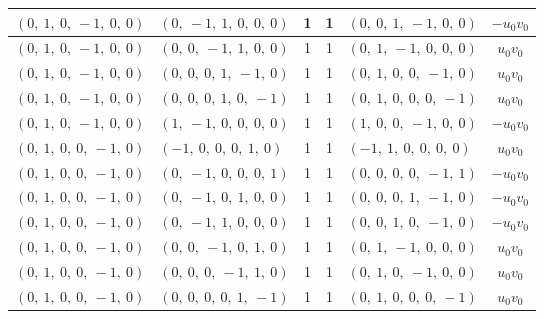 \documentclass[11pt]{article}
\theoremstyle{definition}
\begin{document}
\begin{longtable}{|l|l|c|c|l|c|}
    \hline
    $\left( 0, \  1, \  0, \  -1, \  0, \  0\right)$ & $\left( 0, \  -1, \  1, \  0, \  0, \  0\right)$ & 1 & 1 & $\left( 0, \  0, \  1, \  -1, \  0, \  0\right)$ & $- u_{0} v_{0}$ \\
    \hline
    $\left( 0, \  1, \  0, \  -1, \  0, \  0\right)$ & $\left( 0, \  0, \  -1, \  1, \  0, \  0\right)$ & 1 & 1 & $\left( 0, \  1, \  -1, \  0, \  0, \  0\right)$ & $u_{0} v_{0}$ \\
    \hline
    $\left( 0, \  1, \  0, \  -1, \  0, \  0\right)$ & $\left( 0, \  0, \  0, \  1, \  -1, \  0\right)$ & 1 & 1 & $\left( 0, \  1, \  0, \  0, \  -1, \  0\right)$ & $u_{0} v_{0}$ \\
    \hline
    $\left( 0, \  1, \  0, \  -1, \  0, \  0\right)$ & $\left( 0, \  0, \  0, \  1, \  0, \  -1\right)$ & 1 & 1 & $\left( 0, \  1, \  0, \  0, \  0, \  -1\right)$ & $u_{0} v_{0}$ \\
    \hline
    $\left( 0, \  1, \  0, \  -1, \  0, \  0\right)$ & $\left( 1, \  -1, \  0, \  0, \  0, \  0\right)$ & 1 & 1 & $\left( 1, \  0, \  0, \  -1, \  0, \  0\right)$ & $- u_{0} v_{0}$ \\
    \hline
    $\left( 0, \  1, \  0, \  0, \  -1, \  0\right)$ & $\left( -1, \  0, \  0, \  0, \  1, \  0\right)$ & 1 & 1 & $\left( -1, \  1, \  0, \  0, \  0, \  0\right)$ & $u_{0} v_{0}$ \\
    \hline
    $\left( 0, \  1, \  0, \  0, \  -1, \  0\right)$ & $\left( 0, \  -1, \  0, \  0, \  0, \  1\right)$ & 1 & 1 & $\left( 0, \  0, \  0, \  0, \  -1, \  1\right)$ & $- u_{0} v_{0}$ \\
    \hline
    $\left( 0, \  1, \  0, \  0, \  -1, \  0\right)$ & $\left( 0, \  -1, \  0, \  1, \  0, \  0\right)$ & 1 & 1 & $\left( 0, \  0, \  0, \  1, \  -1, \  0\right)$ & $- u_{0} v_{0}$ \\
    \hline
    $\left( 0, \  1, \  0, \  0, \  -1, \  0\right)$ & $\left( 0, \  -1, \  1, \  0, \  0, \  0\right)$ & 1 & 1 & $\left( 0, \  0, \  1, \  0, \  -1, \  0\right)$ & $- u_{0} v_{0}$ \\
    \hline
    $\left( 0, \  1, \  0, \  0, \  -1, \  0\right)$ & $\left( 0, \  0, \  -1, \  0, \  1, \  0\right)$ & 1 & 1 & $\left( 0, \  1, \  -1, \  0, \  0, \  0\right)$ & $u_{0} v_{0}$ \\
    \hline
    $\left( 0, \  1, \  0, \  0, \  -1, \  0\right)$ & $\left( 0, \  0, \  0, \  -1, \  1, \  0\right)$ & 1 & 1 & $\left( 0, \  1, \  0, \  -1, \  0, \  0\right)$ & $u_{0} v_{0}$ \\
    \hline
    $\left( 0, \  1, \  0, \  0, \  -1, \  0\right)$ & $\left( 0, \  0, \  0, \  0, \  1, \  -1\right)$ & 1 & 1 & $\left( 0, \  1, \  0, \  0, \  0, \  -1\right)$ & $u_{0} v_{0}$ \\

\end{longtable}
\end{document}
